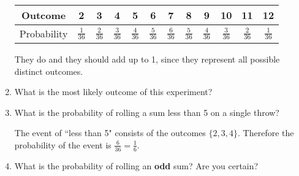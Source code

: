 \documentclass{ccg-topic}
\begin{document}
\begin{todo}
\begin{enumerate}
            	{\answer 
            		\begin{tabular}{c|c|c|c|c|c|c|c|c|c|c|c}
            		Outcome & 2 & 3 & 4 & 5 & 6 & 7 & 8 & 9 & 10 & 11 & 12 \\
            		\hline
            		Probability & $\frac{1}{36}$ & $\frac{2}{36}$ & $\frac{3}{36}$ & $\frac{4}{36}$ & $\frac{5}{36}$ & $\frac{6}{36}$ & $\frac{5}{36}$ & $\frac{4}{36}$ & $\frac{3}{36}$ & $\frac{2}{36}$ & $\frac{1}{36}$ \\
            		\end{tabular} 
            
            	They do and they should add up to 1, since they represent all possible distinct outcomes. } 
            
                \item What is the most likely outcome of this experiment?
            
                {}
            
            	\item What is the probability of rolling a sum less than 5 on a single throw? 
            
            	{\answer The event of ``less than 5" consists of the outcomes $\{2, 3, 4\}$.  Therefore the probability of the event is $\frac{6}{36}=\frac{1}{6}$.} 
            
            
            	\item What is the probability of rolling an \textbf{odd} sum? Are you certain?
            
            	{}
	\end{enumerate}
        \end{todo}
	
\end{document}
